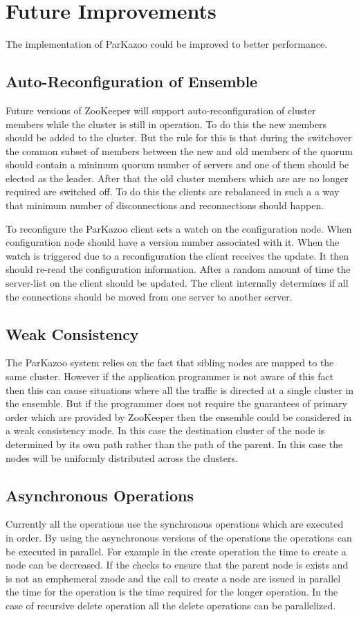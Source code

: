 \chapter{Future Improvements}
The implementation of ParKazoo could be improved to better performance. 

\section{Auto-Reconfiguration of Ensemble}
Future versions of ZooKeeper will support auto-reconfiguration of cluster members while the cluster is still in operation. To do this the new members should be added to the cluster. But the rule for this is that during the switchover the common subset of members between the new and old members of the quorum should contain a minimum quorum number of servers and one of them should be elected as the leader. After that the old cluster members which are are no longer required are switched off. To do this the clients are rebalanced in such a a way that minimum number of disconnections and reconnections should happen. 

To reconfigure the ParKazoo client sets a watch on the configuration node. When configuration node should have a version number associated with it. When the watch is triggered due to a reconfiguration the client receives the update. It then should re-read the configuration information. After a random amount of time the server-list on the client should be updated. The client internally determines if all the connections should be moved from one server to another server.

\section{Weak Consistency}
The ParKazoo system relies on the fact that sibling nodes are mapped to the same cluster. However if the application programmer is not aware of this fact then this can cause situations where all the traffic is directed at a single cluster in the ensemble. But if the programmer does not require the guarantees of primary order which are provided by ZooKeeper then the ensemble could be considered in a weak consistency mode. In this case the destination cluster of the node is determined by its own path rather than the path of the parent. In this case the nodes will be uniformly distributed across the clusters.

\section{Asynchronous Operations}
Currently all the operations use the synchronous operations which are executed in order. By using the asynchronous versions of the operations the operations can be executed in parallel. For example in the create operation the time to create a node can be decreased. If the checks to ensure that the parent node is exists and is not an emphemeral znode and the call to create a node are issued in parallel the time for the operation is the time required for the longer operation. In the case of recursive delete operation all the delete operations can be parallelized.